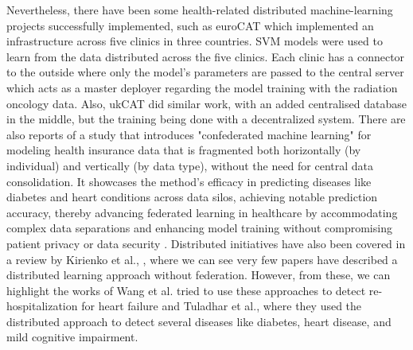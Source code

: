 Nevertheless, there have been some health-related distributed machine-learning projects successfully implemented, such as euroCAT \cite{eurocat} which implemented an infrastructure across five clinics in three countries. SVM models were used to learn from the data distributed across the five clinics. Each clinic has a connector to the outside where only the model's parameters are passed to the central server which acts as a master deployer regarding the model training with the radiation oncology data. Also, ukCAT \cite{ukcat} did similar work, with an added centralised database in the middle, but the training being done with a decentralized system. There are also reports of a study that introduces "confederated machine learning" for modeling health insurance data that is fragmented both horizontally (by individual) and vertically (by data type), without the need for central data consolidation. It showcases the method's efficacy in predicting diseases like diabetes and heart conditions across data silos, achieving notable prediction accuracy, thereby advancing federated learning in healthcare by accommodating complex data separations and enhancing model training without compromising patient privacy or data security \cite{liuConfederatedLearningHealthcare2022}. Distributed initiatives have also been covered in a review by Kirienko et al., \cite{kirienkoDistributedLearningReliable2021a}, where we can see very few papers have described a distributed learning approach without federation. However, from these, we can highlight the works of Wang et al. \cite{wangFastDivideandconquerSparse2019} tried to use these approaches to detect re-hospitalization for heart failure and Tuladhar et al., \cite{distributed} where they used the distributed approach to detect several diseases like diabetes, heart disease, and mild cognitive impairment.

